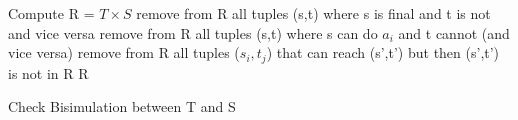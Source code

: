 \documentclass{article}
\begin{document}
\begin{algorithm}
	Compute R = $T\times S$ \;
	remove from R all tuples (s,t) where s is final and t is not and vice versa \;
	remove from R all tuples (s,t) where s can do $a_i$ and t cannot (and vice versa)\;
	remove from R all tuples ($s_i,t_j$) that can reach (s',t') but then (s',t') is not in R \;
	\Return R\;
	\caption{Check Bisimulation between T and S}
\end{algorithm}
\end{document}
